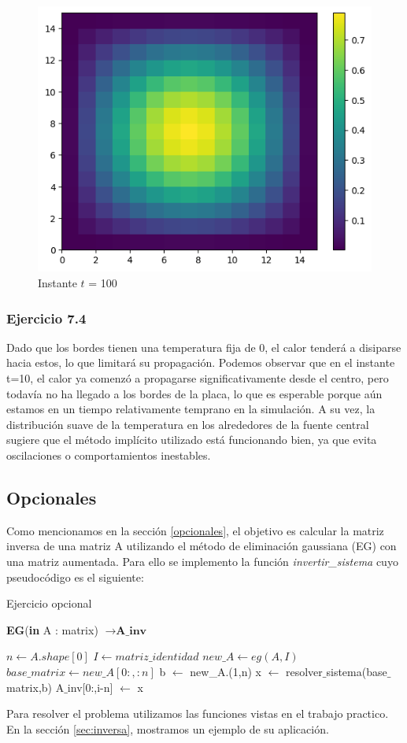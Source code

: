 \begin{figure}[H]
\begin{minipage}[b]{0.5\linewidth}
        \vspace{4ex}
      \end{minipage}%
      \begin{minipage}[b]{0.5\linewidth}
       \centering
       \includegraphics[width=.5\linewidth]{./img/instante_100.png}
      \caption{Instante $t$ = 100}\label{instante100}
        \vspace{4ex}
      \end{minipage} 
    \end{figure}


    \subsubsection{Ejercicio 7.4}
    Dado que los bordes tienen una temperatura fija de 0, el calor tenderá a disiparse hacia estos, lo que limitará su propagación.
    Podemos observar que en el instante t=10, el calor ya comenzó a propagarse significativamente desde el centro, pero todavía no ha llegado a los bordes de la placa, lo que es esperable porque aún estamos en un tiempo relativamente temprano en la simulación. A su vez, la distribución suave de la temperatura en los alrededores de la fuente central sugiere que el método implícito utilizado está funcionando bien, ya que evita oscilaciones o comportamientos inestables.
\fi


 \subsection{Opcionales}

 Como mencionamos en la sección \ref{opcionales}, el objetivo es calcular la matriz inversa de una matriz A utilizando el método de eliminación gaussiana (EG) con una matriz aumentada. Para ello se implemento la función \textit{invertir\_sistema} cuyo pseudocódigo es el siguiente: 
 
\begin{algorithm}[H]
\caption{Ejercicio opcional}
\begin{algorithmic}
\State \textbf{EG}(\textbf{in} A : matrix) $\to \textbf{A\_inv}$
 
 \State $n \gets A.shape[0]$
 \State $I \gets matriz\_identidad$
 \State $new\_A \gets eg(A,I)$
 \State $base\_matrix \gets new\_A[0:,:n]$
        \State  b $\gets$ new\_A.(1,n)
        \State x $\gets$ resolver$\_$sistema(base$\_$matrix,b)
        \State A$\_$inv[0:,i-n] $\gets$ x
\EndFor

\end{algorithmic}
\end{algorithm}

Para resolver el problema utilizamos las funciones vistas en el trabajo practico. En la sección \ref{sec:inversa}, mostramos un ejemplo de su aplicación.
